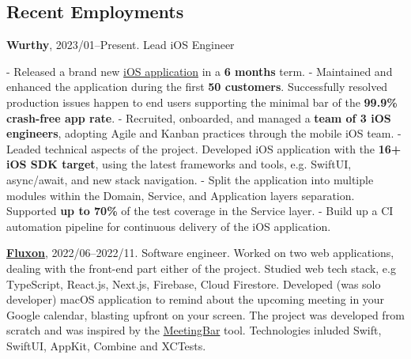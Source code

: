 \documentclass{nk-resume}
\begin{document}

\subsection*{Recent Employments}

\textbf{Wurthy}, 2023/01--Present.
Lead iOS Engineer

\newline- Released a brand new {\href{https://apps.apple.com/us/app/wurthy/id6446956833}{iOS application}} in a \textbf{6 months} term.
\newline- Maintained and enhanced the application during the first \textbf{50 customers}. Successfully resolved production issues happen to end users supporting the minimal bar of the \textbf{99.9\% crash-free app rate}.
\newline- Recruited, onboarded, and managed a \textbf{team of 3 iOS engineers}, adopting Agile and Kanban practices through the mobile iOS team.
\newline- Leaded technical aspects of the project. Developed iOS application with the \textbf{16+ iOS SDK target}, using the latest frameworks and tools, e.g. SwiftUI, async/await, and new stack navigation.
\newline- Split the application into multiple modules within the Domain, Service, and Application layers separation. Supported \textbf{up to 70\%} of the test coverage in the Service layer.
\newline- Build up a CI automation pipeline for continuous delivery of the iOS application.

\vspace*{14px}

\textbf{\href{https://www.fluxon.com/}{Fluxon}}, 2022/06--2022/11.
Software engineer.
\newline Worked on two web applications, dealing with the front-end part either of the project.
Studied web tech stack, e.g TypeScript, React.js, Next.js, Firebase, Cloud Firestore.
\newline Developed (was solo developer) macOS application to remind about the upcoming meeting 
in your Google calendar, blasting upfront on your screen. The project was developed from scratch and 
was inspired by the \href{https://github.com/leits/MeetingBar}{MeetingBar} tool.
Technologies inluded Swift, SwiftUI, AppKit, Combine and XCTests.

\vspace*{14px}
\end{document}

